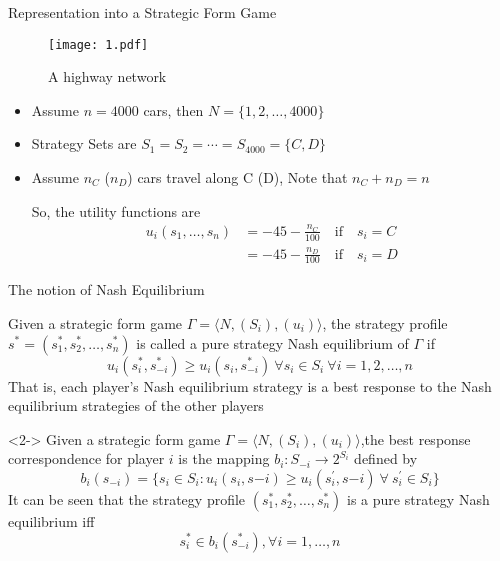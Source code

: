 \documentclass[10pt]{beamer}  %
\begin{document}
\begin{frame}{Representation into a Strategic Form Game}   %
    \begin{figure}
        \centering
        \texttt{[image: 1.pdf]}
        \caption{A highway network}
    \end{figure}
    \begin{itemize}
        \item Assume $n=4000$ cars, then $N=\{1,2,\ldots,4000\}$
        \item Strategy Sets are $S_1=S_2=\cdots=S_{4000}=\{C,D\}$
        \item Assume $n_C$ ($n_D$) cars travel along C (D), Note that $n_C+n_D=n$

        So, the utility functions are
        \begin{align*}
            u_i(s_1,\ldots,s_n)&=-45-\frac{n_C}{100} \quad \text{if} \quad s_i = C\\
            &=-45-\frac{n_D}{100} \quad \text{if} \quad s_i = D
        \end{align*}
    \end{itemize}
\end{frame}

\begin{frame}{The notion of Nash Equilibrium}   %
    \begin{definition}
        Given a strategic form game $\Gamma = \langle N,(S_i),(u_i)\rangle$, the strategy profile $s^*=(s_1^*,s_2^*,\ldots,s_n^*)$ is called a pure strategy Nash equilibrium of $\Gamma$ if
        \[u_i(s^*_i,s^*_{-i})\geq u_i(s_i,s^*_{-i})\ \forall s_{i} \in S_{i}\ \forall i=1,2,\ldots,n\]
        That is, each player’s Nash equilibrium strategy is a best response to the Nash equilibrium strategies of the other players
    \end{definition}

    \begin{definition}<2->
        Given a strategic form game $\Gamma = \langle N,(S_i),(u_i)\rangle$,the best response correspondence for player $i$ is the mapping $b_i : S_{-i} \rightarrow 2^{S_i}$ defined by
        \[b_i(s_{-i}) = \{s_i \in S_i : u_i(s_i, s{-i}) \geq u_i(s^\prime_i, s{-i}) \ \forall\  s^\prime_i \in S_i\}\]
        It can be seen that the strategy profile $(s_1^*,s_2^*,\ldots,s_n^*)$ is a pure strategy Nash equilibrium iff
        \[s^*_i \in b_i(s^*_{-i}), \forall i = 1,\ldots, n\]
    \end{definition}
\end{frame}
\end{document}
